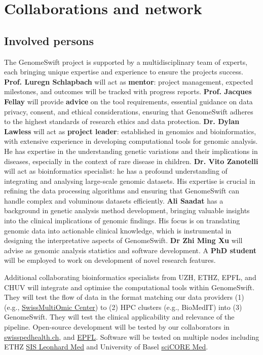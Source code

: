 
\section{Collaborations and network}
\subsection{Involved persons}

The GenomeSwift project is supported by a multidisciplinary team of
experts, each bringing unique expertise and experience to ensure the
project\textquotesingle s success. \textbf{Prof. Luregn Schlapbach} will
act as \textbf{mentor}: project management, expected milestones, and
outcomes will be tracked with progress reports. \textbf{Prof. Jacques
Fellay} will provide \textbf{advice} on the tool requirements, essential
guidance on data privacy, consent, and ethical considerations, ensuring
that GenomeSwift adheres to the highest standards of research ethics and
data protection. \textbf{Dr. Dylan Lawless} will act as \textbf{project
leader}: established in genomics and bioinformatics, with extensive
experience in developing computational tools for genomic analysis. He
has expertise in the understanding genetic variations and their
implications in diseases, especially in the context of rare disease in
children. \textbf{Dr. Vito Zanotelli} will act as bioinformatics specialist: he has a
profound understanding of integrating and analysing large-scale genomic
datasets. His expertise is crucial in refining the data processing
algorithms and ensuring that GenomeSwift can handle complex and
voluminous datasets efficiently. 
\textbf{Ali Saadat} has a background in genetic analysis method development, bringing valuable insights into the
clinical implications of genomic findings. His focus is on translating genomic data into actionable clinical knowledge, which is instrumental in designing the interpretative aspects of GenomeSwift. 
\textbf{Dr Zhi Ming Xu} will advise as genomic analysis statistics and software development. A \textbf{PhD student} will be employed to work on development of novel
research features.

Additional collaborating bioinformatics specialists from UZH, ETHZ,
EPFL, and CHUV will integrate and optimise the computational tools
within GenomeSwift. They will test the flow of data in the format
matching our data providers (1) (e.g.,
\href{http://smoc.ethz.ch/}{SwissMultiOmic Center}) to (2) HPC clusters
(e.g., BioMedIT) into (3) GenomeSwift. They will test the clinical
applicability and relevance of the pipeline. Open-source development
will be tested by our collaborators in
\href{https://www.swisspedhealth.ch/}{swisspedhealth.ch}, and
\href{https://www.epfl.ch/labs/fellay-lab/}{EPFL}. Software will be
tested on multiple nodes including ETHZ
\href{https://unlimited.ethz.ch/display/LeoMed2/Leonhard+Med+Intro+for+shareholders}{SIS
Leonhard Med} and University of Basel
\href{https://scicore.unibas.ch/}{sciCORE Med}.


